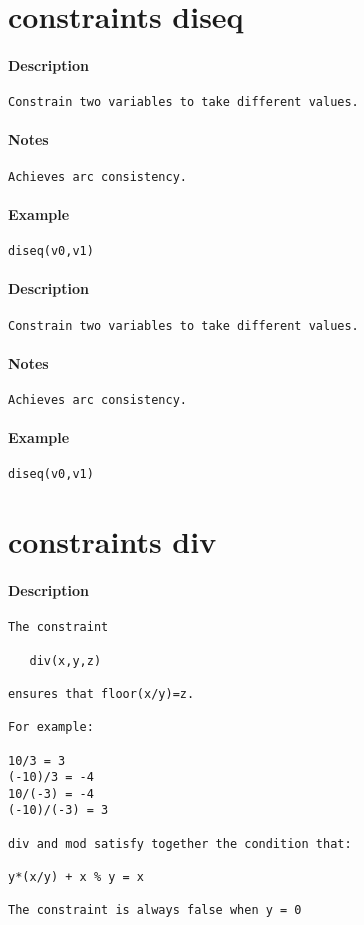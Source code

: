 \section{constraints diseq}
\paragraph{Description}
{\footnotesize
\begin{verbatim}
Constrain two variables to take different values.
\end{verbatim}
}
\paragraph{Notes}
{\footnotesize
\begin{verbatim}
Achieves arc consistency.
\end{verbatim}
}
\paragraph{Example}
{\footnotesize
\begin{verbatim}
diseq(v0,v1)
\end{verbatim}
}
\paragraph{Description}
{\footnotesize
\begin{verbatim}
Constrain two variables to take different values.
\end{verbatim}
}
\paragraph{Notes}
{\footnotesize
\begin{verbatim}
Achieves arc consistency.
\end{verbatim}
}
\paragraph{Example}
{\footnotesize
\begin{verbatim}
diseq(v0,v1)
\end{verbatim}
}
\section{constraints div}
\paragraph{Description}
{\footnotesize
\begin{verbatim}
The constraint
 
   div(x,y,z)

ensures that floor(x/y)=z.

For example:

10/3 = 3
(-10)/3 = -4
10/(-3) = -4
(-10)/(-3) = 3

div and mod satisfy together the condition that:

y*(x/y) + x % y = x

The constraint is always false when y = 0
\end{verbatim}
}
